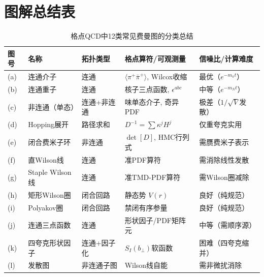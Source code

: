 \documentclass[12pt,a4paper]{ctexart}
\begin{document}
\section{图解总结表}

\begin{table}[H]
\centering
\caption{格点QCD中12类常见费曼图的分类总结}
\label{tab:diagram_summary}
\small
\begin{tabular}{p{1cm}p{2.5cm}p{2cm}p{3.5cm}p{3cm}}
\toprule
\textbf{图号} & \textbf{名称} & \textbf{拓扑类型} & \textbf{格点算符/可观测量} & \textbf{信噪比/计算难度} \\
\midrule
(a) & 连通介子 & 连通 & $\langle\pi^+ \bar\pi^+\rangle$, Wilcox收缩 & 最优（$e^{-m_\pi t}$）\\
(b) & 连通重子 & 连通 & 核子三点函数, $\epsilon^{abc}$ & 中等（$e^{-m_N t}$）\\
(c) & 非连通（单态） & 连通+非连通 & 味单态介子, 奇异PDF & 极差（$1/\sqrt{V}$发散）\\
(d) & Hopping展开 & 路径求和 & $D^{-1}=\sum\kappa^j H^j$ & 仅重夸克实用 \\
(e) & 闭合费米子环 & 非连通 & $\det[D]$, HMC行列式 & 需赝费米子表示 \\
(f) & 直Wilson线 & 连通 & 准PDF算符 & 需消除线性发散 \\
(g) & Staple Wilson线 & 连通 & 准TMD-PDF算符 & 需Wilson圈减除 \\
(h) & 矩形Wilson圈 & 闭合回路 & 静态势 $V(r)$ & 良好（纯规范） \\
(i) & Polyakov圈 & 闭合回路 & 禁闭有序参量 & 良好（纯规范） \\
(j) & 连通三点函数 & 连通 & 形状因子/PDF矩阵元 & 中等（需顺序源）\\
(k) & 四夸克形状因子 & 连通+因子化 & $S_I(b_\perp)$软函数 & 困难（四夸克缩并）\\
(l) & 发散图 & 非连通子图 & Wilson线自能 & 需非微扰消除 \\
\bottomrule
\end{tabular}
\end{table}
\end{document}
